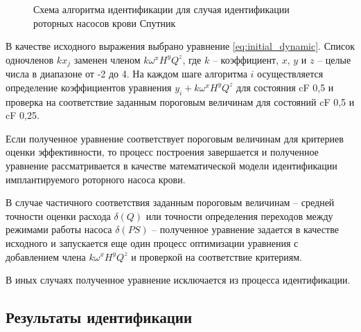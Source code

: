 \begin{figure}[!ht]
\caption{Схема алгоритма идентификации для случая идентификации роторных насосов крови Спутник} 
\label{img:flowchart_upd}  
\end{figure}

В качестве исходного выражения выбрано уравнение \eqref{eq:initial_dynamic}. Список одночленов $kx_j$ заменен членом $k\omega^xH^yQ^z$, где $k$ -- коэффициент, $x$, $y$ и $z$ -- целые числа в диапазоне от -2 до 4. На каждом шаге алгоритма $i$ осуществляется определение коэффициентов уравнения $y_i + k\omega^xH^yQ^z$ для состояния cF 0,5 и проверка на соответствие заданным пороговым величинам для состояний cF 0,5 и cF 0,25. 

Если полученное уравнение соответствует пороговым величинам для критериев оценки эффективности, то процесс построения завершается и полученное уравнение рассматривается в качестве математической модели идентификации имплантируемого роторного насоса крови. 

В случае частичного соответствия заданным пороговым величинам -- средней точности оценки расхода $\delta(Q)$ или точности определения переходов между режимами работы насоса $\delta(PS)$ -- полученное уравнение задается в качестве исходного и запускается еще один процесс оптимизации уравнения с добавлением члена $k\omega^xH^yQ^z$ и проверкой на соответствие критериям. 

В иных случаях полученное уравнение исключается из процесса идентификации. 

\subsection{Результаты идентификации}

